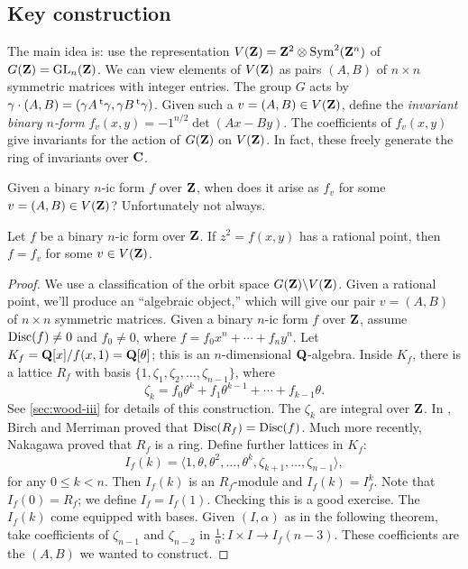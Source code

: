 \subsection{Key construction}

The main idea is: use the representation 
$V(\mathbf{Z})=\mathbf{Z}^2\otimes\operatorname{Sym}^2(\mathbf{Z}^n)$ of $G(\mathbf{Z})=\operatorname{GL}_n(\mathbf{Z})$. 
We can view elements of $V(\mathbf{Z})$ as pairs $(A,B)$ of $n\times n$ symmetric 
matrices with integer entries. The group $G$ acts by 
$\gamma\cdot (A,B) = (\gamma A\prescript{\mathrm{t}}{}{\gamma}, \gamma B \prescript{\mathrm{t}}{}{\gamma})$. 
Given such a $v=(A,B)\in V(\mathbf{Z})$, define the \emph{invariant binary $n$-form} 
$f_v(x,y)=-1^{n/2}\det(A x-B y)$. The coefficients of $f_v(x,y)$ give 
invariants for the action of $G(\mathbf{Z})$ on $V(\mathbf{Z})$. In fact, these freely 
generate the ring of invariants over $\mathbf{C}$. 

Given a binary $n$-ic form $f$ over $\mathbf{Z}$, when does it arise as $f_v$ for some 
$v=(A,B)\in V(\mathbf{Z})$? Unfortunately not always. 

\begin{prop}
Let $f$ be a binary $n$-ic form over $\mathbf{Z}$. If $z^2=f(x,y)$ has a rational 
point, then $f=f_v$ for some $v\in V(\mathbf{Z})$. 
\end{prop}
\begin{proof}
We use a classification of the orbit space $G(\mathbf{Z})\backslash V(\mathbf{Z})$. Given 
a rational point, we'll produce an ``algebraic object,'' which will give our 
pair $v=(A,B)$ of $n\times n$ symmetric matrices. Given 
a binary $n$-ic form $f$ over $\mathbf{Z}$, assume $\operatorname{Disc}(f)\ne 0$ and 
$f_0\ne 0$, where $f=f_0 x^n + \cdots + f_n y^n$. Let 
$K_f = \mathbf{Q}[x]/f(x,1) = \mathbf{Q}[\theta]$; this is an $n$-dimensional $\mathbf{Q}$-algebra. 
Inside $K_f$, there is a lattice $R_f$ with basis 
$\{1,\zeta_1,\zeta_2,\dots,\zeta_{n-1}\}$, where 
\[
  \zeta_k = f_0 \theta^k + f_1 \theta^{k-1} + \cdots + f_{k-1} \theta .
\]
See \autoref{sec:wood-iii} for details of this construction. The $\zeta_k$ 
are integral over $\mathbf{Z}$. In \cite{bm72}, Birch and Merriman proved that 
$\operatorname{Disc}(R_f)=\operatorname{Disc}(f)$. Much more recently, Nakagawa proved 
that $R_f$ is a ring. Define further lattices in $K_f$: 
\[
  I_f(k) = \langle 1,\theta,\theta^2,\dots,\theta^k,\zeta_{k+1},\dots,\zeta_{n-1}\rangle ,
\]
for any $0\leqslant k<n$. Then $I_f(k)$ is an $R_f$-module and 
$I_f(k)=I_f^k$. Note that $I_f(0)=R_f$; we define $I_f=I_f(1)$. Checking this 
is a good exercise. The $I_f(k)$ come equipped with bases. Given 
$(I,\alpha)$ as in the following theorem, take coefficients of $\zeta_{n-1}$ 
and $\zeta_{n-2}$ in $\frac 1 \alpha:I\times I \to I_f(n-3)$. These 
coefficients are the $(A,B)$ we wanted to construct. 
\end{proof}


